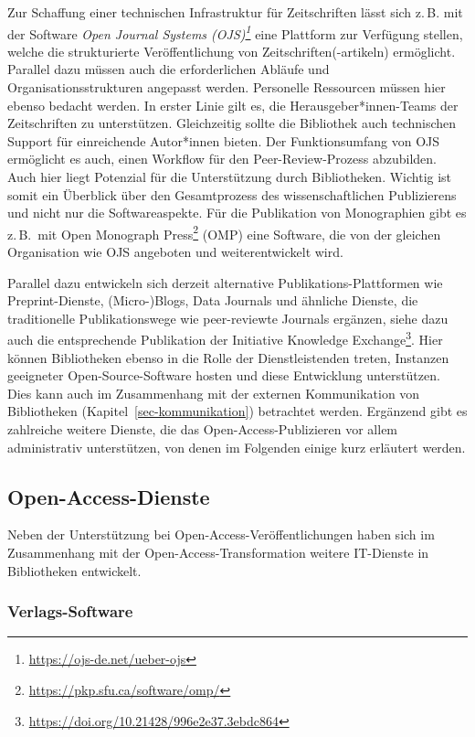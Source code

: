 \documentclass[
  11pt,
  letterpaper,
  DIV=11,
  twoside]{scrreprt}
\DeclareRobustCommand{\href}[2]{#2\footnote{\url{#1}}}
\begin{document}
Zur Schaffung einer technischen Infrastruktur für Zeitschriften lässt
sich z.\,B. mit der Software
\emph{\href{https://ojs-de.net/ueber-ojs}{Open Journal Systems (OJS)}}
eine Plattform zur Verfügung stellen, welche die strukturierte
Veröffentlichung von Zeitschriften(-artikeln) ermöglicht. Parallel dazu
müssen auch die erforderlichen Abläufe und Organisationsstrukturen
angepasst werden. Personelle Ressourcen müssen hier ebenso bedacht
werden. In erster Linie gilt es, die Herausgeber*innen-Teams der
Zeitschriften zu unterstützen. Gleichzeitig sollte die Bibliothek auch
technischen Support für einreichende Autor*innen bieten. Der
Funktionsumfang von {OJS} ermöglicht es auch, einen Workflow für den
Peer-Review-Prozess abzubilden. Auch hier liegt Potenzial für die
Unterstützung durch Bibliotheken. Wichtig ist somit ein Überblick über
den Gesamtprozess des wissenschaftlichen Publizierens und nicht nur die
Softwareaspekte. Für die Publikation von Monographien gibt es z.\,B.~mit
\href{https://pkp.sfu.ca/software/omp/}{Open Monograph Press} ({OMP})
eine Software, die von der gleichen Organisation wie {OJS} angeboten und
weiterentwickelt wird.

Parallel dazu entwickeln sich derzeit alternative
Publikations-Plattformen wie Preprint-Dienste, (Micro-)Blogs, Data
Journals und ähnliche Dienste, die traditionelle Publikationswege wie
peer-reviewte Journals ergänzen, siehe dazu auch die entsprechende
\href{https://doi.org/10.21428/996e2e37.3ebdc864}{Publikation der
Initiative Knowledge Exchange}. Hier können Bibliotheken ebenso in die
Rolle der Dienstleistenden treten, Instanzen geeigneter
Open-Source-Software hosten und diese Entwicklung unterstützen. Dies
kann auch im Zusammenhang mit der externen Kommunikation von
Bibliotheken (Kapitel~\ref{sec-kommunikation}) betrachtet werden.
Ergänzend gibt es zahlreiche weitere Dienste, die das
Open-Access-Publizieren vor allem administrativ unterstützen, von denen
im Folgenden einige kurz erläutert werden.

\subsection{Open-Access-Dienste}\label{open-access-dienste}

Neben der Unterstützung bei Open-Access-Veröffentlichungen haben sich im
Zusammenhang mit der Open-Access-Transformation weitere IT-Dienste in
Bibliotheken entwickelt.

\subsubsection{Verlags-Software}\label{verlags-software}
\end{document}
